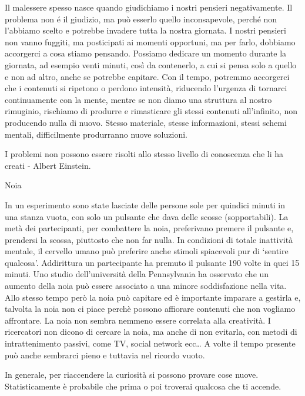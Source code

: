 \documentclass[12pt]{book} %
\begin{document}
Il malessere spesso nasce quando giudichiamo i nostri pensieri negativamente. Il problema non é il giudizio, ma può esserlo quello inconsapevole, perché non l'abbiamo scelto e potrebbe invadere tutta la nostra giornata.
I nostri pensieri non vanno fuggiti, ma posticipati ai momenti opportuni, ma per farlo, dobbiamo accorgerci a cosa stiamo pensando. Possiamo dedicare un momento durante la giornata, ad esempio venti minuti, così da contenerlo, a cui si pensa solo a quello e non ad altro, anche se potrebbe capitare.
Con il tempo, potremmo accorgerci che i contenuti si ripetono o perdono intensità, riducendo l’urgenza di tornarci continuamente con la mente, mentre se non diamo una struttura al nostro rimuginio, rischiamo di produrre e rimasticare gli stessi contenuti all'infinito, non producendo nulla di nuovo. Stesso materiale, stesse informazioni, stessi schemi mentali, difficilmente produrranno nuove soluzioni. 

I problemi non possono essere risolti allo stesso livello di conoscenza che li ha creati - Albert Einstein.

\begin{mdframed}[linewidth=1pt]
Noia

In un esperimento sono state lasciate delle persone sole per quindici minuti in una stanza vuota, con solo un pulsante che dava delle scosse (sopportabili). La metà dei partecipanti, per combattere la noia, preferivano premere il pulsante e, prendersi la scossa, piuttosto che non far nulla. In condizioni di totale inattività mentale, il cervello umano può preferire anche stimoli spiacevoli pur di ‘sentire qualcosa’. Addirittura un partecipante ha premuto il pulsante 190 volte in quei 15 minuti. Uno studio dell'università della Pennsylvania ha osservato che un aumento della noia può essere associato a una minore soddisfazione nella vita.
Allo stesso tempo però la noia può capitare ed è importante imparare a gestirla e, talvolta la noia non ci piace perchè possono affiorare contenuti che non vogliamo affrontare. 
La noia non sembra nemmeno essere correlata alla creatività. I ricercatori non dicono di cercare la noia, ma anche di non evitarla, con metodi di intrattenimento passivi, come TV, social network ecc…
A volte il tempo presente può anche sembrarci pieno e tuttavia nel ricordo vuoto.

In generale, per riaccendere la curiosità si possono provare cose nuove. Statisticamente è probabile che prima o poi troverai qualcosa che ti accende.
\end{mdframed}
\end{document}
